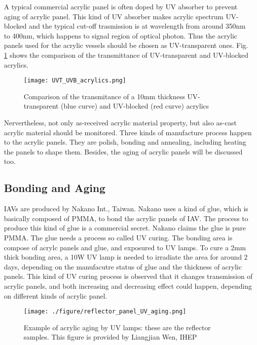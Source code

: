 A typical commercial acrylic panel is often doped by UV absorber
to prevent aging of acrylic panel. This kind of UV absorber makes acrylic spectrum
UV-blocked and the typical cut-off trasmission is at wavelength from around 350nm to 400nm,
which happens to signal region of optical photon.
Thus the acrylic panels used for the acrylic vessels should be chosen as
UV-transparent ones. Fig. \ref{UVTUVBAcrylics} shows the comparison of the transmittance of UV-transparent
and UV-blocked acrylics.


\begin{figure}
    \centering
    \texttt{[image: UVT\_UVB\_acrylics.png]}
    \caption{Comparison of the transmitance of a 10mm thickness UV-transparent (blue curve) and UV-blocked (red curve) acrylics}
    \label{UVTUVBAcrylics}
    \end{figure}



Nervertheless, not only as-received acrylic material property, but also as-cast
acrylic material should be monitored. Three kinds of manufacture process happen to the acrylic panels.
They are polish, bonding and annealing, including heating the panels to shape them. Besides,
the aging of acrylic panels will be discussed too.


\subsection {Bonding and Aging}

IAVs are produced by Nakano Int., Taiwan. Nakano uses a kind of glue, which is basically
composed of PMMA, to bond the acrylic panels of IAV. The process to produce this kind of glue is a commercial
secret. Nakano claims the glue is pure PMMA. The glue needs a process so called UV curing. The bonding area
is compose of acrylc panels and glue, and exposured to UV lamps. To cure a 2mm thick bonding
area, a 10W UV lamp is needed to irradiate the area for around 2 days, depending on the manufacutre status of glue
and the thickness of acrylic panels. This kind of UV curing process is observed that it changes transmission of acrylic panels,
and both increasing and decreasing effect could happen, depending on different kinds of acrylic panel.


\begin{figure}
    \centering
    \texttt{[image: ./figure/reflector\_panel\_UV\_aging.png]}
    \caption [Example of acrylic aging by UV lamps]
    {Example of acrylic aging by UV lamps: these are the reflector samples. This figure is provided by Liangjian Wen, IHEP}
    \label{ReflectorAging}
    \end{figure}



